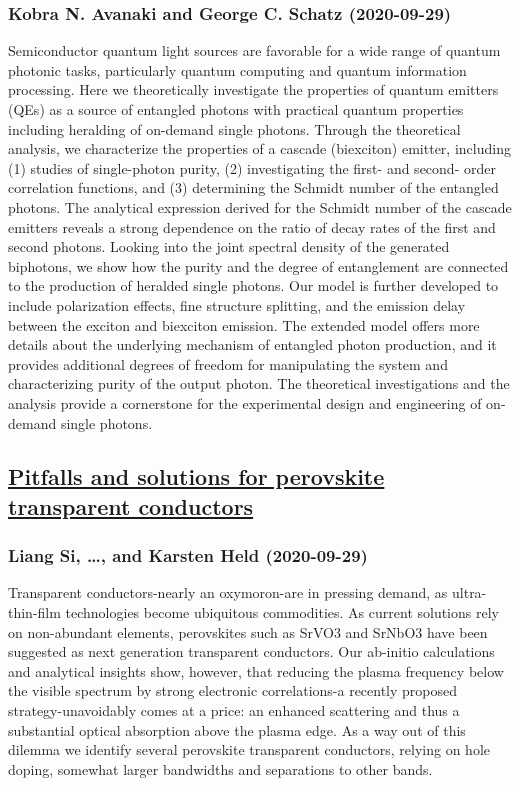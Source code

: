 \subsubsection*{Kobra N. Avanaki and George C. Schatz (2020-09-29)}
Semiconductor quantum light sources are favorable for a wide range of quantum
photonic tasks, particularly quantum computing and quantum information
processing. Here we theoretically investigate the properties of quantum
emitters (QEs) as a source of entangled photons with practical quantum
properties including heralding of on-demand single photons. Through the
theoretical analysis, we characterize the properties of a cascade (biexciton)
emitter, including (1) studies of single-photon purity, (2) investigating the
first- and second- order correlation functions, and (3) determining the Schmidt
number of the entangled photons. The analytical expression derived for the
Schmidt number of the cascade emitters reveals a strong dependence on the ratio
of decay rates of the first and second photons. Looking into the joint spectral
density of the generated biphotons, we show how the purity and the degree of
entanglement are connected to the production of heralded single photons.
  Our model is further developed to include polarization effects, fine
structure splitting, and the emission delay between the exciton and biexciton
emission. The extended model offers more details about the underlying mechanism
of entangled photon production, and it provides additional degrees of freedom
for manipulating the system and characterizing purity of the output photon. The
theoretical investigations and the analysis provide a cornerstone for the
experimental design and engineering of on-demand single photons.

\subsection*{\href{http://arxiv.org/abs/2009.14000v1}{Pitfalls and solutions for perovskite transparent conductors}}
\subsubsection*{Liang Si, \dots, and Karsten Held (2020-09-29)}
Transparent conductors-nearly an oxymoron-are in pressing demand, as
ultra-thin-film technologies become ubiquitous commodities. As current
solutions rely on non-abundant elements, perovskites such as SrVO3 and SrNbO3
have been suggested as next generation transparent conductors. Our ab-initio
calculations and analytical insights show, however, that reducing the plasma
frequency below the visible spectrum by strong electronic correlations-a
recently proposed strategy-unavoidably comes at a price: an enhanced scattering
and thus a substantial optical absorption above the plasma edge. As a way out
of this dilemma we identify several perovskite transparent conductors, relying
on hole doping, somewhat larger bandwidths and separations to other bands.

